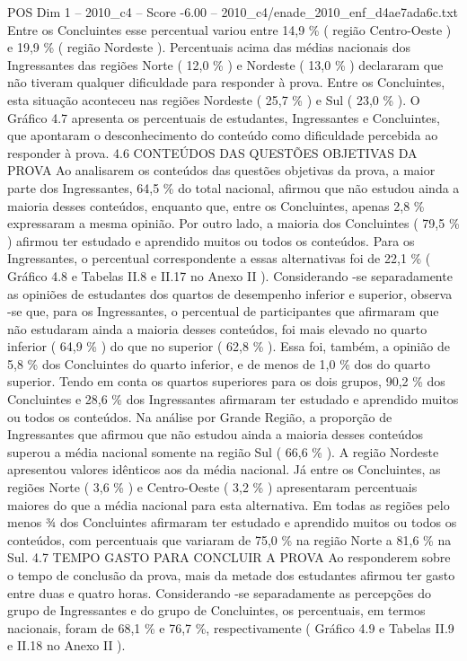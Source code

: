 \begin{textsample}{POS Dim 1 – 2010\_c4 – Score -6.00 – 2010\_c4/enade\_2010\_enf\_d4ae7ada6c.txt}
Entre os Concluintes esse percentual variou entre 14,9 \% ( região Centro-Oeste ) e 19,9 \% ( região Nordeste ).
Percentuais acima das médias nacionais dos Ingressantes das regiões Norte ( 12,0 \% ) e Nordeste ( 13,0 \% ) declararam que não tiveram qualquer dificuldade para responder à prova.
Entre os Concluintes, esta situação aconteceu nas regiões Nordeste ( 25,7 \% ) e Sul ( 23,0 \% ).
O Gráfico 4.7 apresenta os percentuais de estudantes, Ingressantes e Concluintes, que apontaram o desconhecimento do conteúdo como dificuldade percebida ao responder à prova. 4.6 CONTEÚDOS DAS QUESTÕES OBJETIVAS DA PROVA Ao analisarem os conteúdos das questões objetivas da prova, a maior parte dos Ingressantes, 64,5 \% do total nacional, afirmou que não estudou ainda a maioria desses conteúdos, enquanto que, entre os Concluintes, apenas 2,8 \% expressaram a mesma opinião.
Por outro lado, a maioria dos Concluintes ( 79,5 \% ) afirmou ter estudado e aprendido muitos ou todos os conteúdos.
Para os Ingressantes, o percentual correspondente a essas alternativas foi de 22,1 \% ( Gráfico 4.8 e Tabelas II.8 e II.17 no Anexo II ).
Considerando -se separadamente as opiniões de estudantes dos quartos de desempenho inferior e superior, observa -se que, para os Ingressantes, o percentual de participantes que afirmaram que não estudaram ainda a maioria desses conteúdos, foi mais elevado no quarto inferior ( 64,9 \% ) do que no superior ( 62,8 \% ).
Essa foi, também, a opinião de 5,8 \% dos Concluintes do quarto inferior, e de menos de 1,0 \% dos do quarto superior.
Tendo em conta os quartos superiores para os dois grupos, 90,2 \% dos Concluintes e 28,6 \% dos Ingressantes afirmaram ter estudado e aprendido muitos ou todos os conteúdos.
Na análise por Grande Região, a proporção de Ingressantes que afirmou que não estudou ainda a maioria desses conteúdos superou a média nacional somente na região Sul ( 66,6 \% ).
A região Nordeste apresentou valores idênticos aos da média nacional.
Já entre os Concluintes, as regiões Norte ( 3,6 \% ) e Centro-Oeste ( 3,2 \% ) apresentaram percentuais maiores do que a média nacional para esta alternativa.
Em todas as regiões pelo menos ¾ dos Concluintes afirmaram ter estudado e aprendido muitos ou todos os conteúdos, com percentuais que variaram de 75,0 \% na região Norte a 81,6 \% na Sul. 4.7 TEMPO GASTO PARA CONCLUIR A PROVA Ao responderem sobre o tempo de conclusão da prova, mais da metade dos estudantes afirmou ter gasto entre duas e quatro horas.
Considerando -se separadamente as percepções do grupo de Ingressantes e do grupo de Concluintes, os percentuais, em termos nacionais, foram de 68,1 \% e 76,7 \%, respectivamente ( Gráfico 4.9 e Tabelas II.9 e II.18 no Anexo II ).

\end{textsample}

